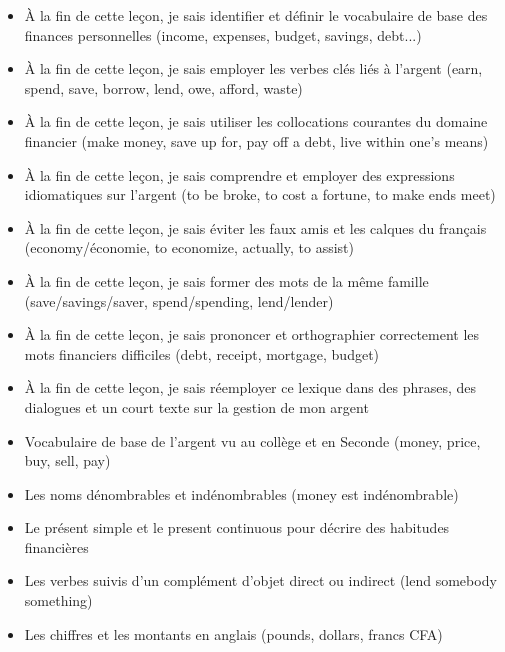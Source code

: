 \documentclass[11pt]{article}
\begin{document}
\begin{objectifs}
\begin{itemize}
\item À la fin de cette leçon, je sais identifier et définir le vocabulaire de base des finances personnelles (income, expenses, budget, savings, debt...)
\item À la fin de cette leçon, je sais employer les verbes clés liés à l'argent (earn, spend, save, borrow, lend, owe, afford, waste)
\item À la fin de cette leçon, je sais utiliser les collocations courantes du domaine financier (make money, save up for, pay off a debt, live within one's means)
\item À la fin de cette leçon, je sais comprendre et employer des expressions idiomatiques sur l'argent (to be broke, to cost a fortune, to make ends meet)
\item À la fin de cette leçon, je sais éviter les faux amis et les calques du français (economy/économie, to economize, actually, to assist)
\item À la fin de cette leçon, je sais former des mots de la même famille (save/savings/saver, spend/spending, lend/lender)
\item À la fin de cette leçon, je sais prononcer et orthographier correctement les mots financiers difficiles (debt, receipt, mortgage, budget)
\item À la fin de cette leçon, je sais réemployer ce lexique dans des phrases, des dialogues et un court texte sur la gestion de mon argent
\end{itemize}
\end{objectifs}

\begin{prerequis}
\begin{itemize}
\item Vocabulaire de base de l'argent vu au collège et en Seconde (money, price, buy, sell, pay)
\item Les noms dénombrables et indénombrables (money est indénombrable)
\item Le présent simple et le present continuous pour décrire des habitudes financières
\item Les verbes suivis d'un complément d'objet direct ou indirect (lend somebody something)
\item Les chiffres et les montants en anglais (pounds, dollars, francs CFA)
\end{itemize}
\end{prerequis}
\end{document}

